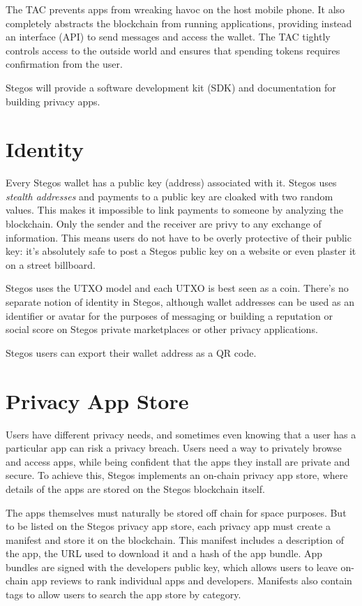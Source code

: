 \documentclass[8pt,fleqn,openany]{book}
\begin{document}
The TAC prevents apps from wreaking havoc on the host mobile phone. It also completely abstracts the blockchain from running applications, providing instead an interface (API) to send messages and access the wallet. The TAC tightly controls access to the outside world and ensures that spending tokens requires confirmation from the user. 

Stegos will provide a software development kit (SDK) and documentation for building privacy apps. 

\section{Identity}\label{sec:identity}
Every Stegos wallet has a public key (address) associated with it. Stegos uses \textit{stealth addresses} and payments to a public key are cloaked with two random values. This makes it impossible to link payments to someone by analyzing the blockchain. Only the sender and the receiver are privy to any exchange of information. This means users do not have to be overly protective of their public key: it’s absolutely safe to post a Stegos public key on a website or even plaster it on a street billboard. 

Stegos uses the UTXO model and each UTXO is best seen as a coin. There’s no separate notion of identity in Stegos, although wallet addresses can be used as an identifier or avatar for the purposes of messaging or building a reputation or social score on Stegos private marketplaces or other privacy applications. 

Stegos users can export their wallet address as a QR code.
	
\section{Privacy App Store}\label{sec:appstore}
Users have different privacy needs, and sometimes even knowing that a user has a particular app can risk a privacy breach. Users need a way to privately browse and access apps, while being confident that the apps they install are private and secure. To achieve this, Stegos implements an on-chain privacy app store, where details of the apps are stored on the Stegos blockchain itself.

The apps themselves must naturally be stored off chain for space purposes. But to be listed on the Stegos privacy app store, each privacy app must create a manifest and store it on the blockchain. This manifest includes a description of the app, the URL used to download it and a hash of the app bundle. App bundles are signed with the developers public key, which allows users to leave on-chain app reviews to rank individual apps and developers. Manifests also contain tags to allow users to search the app store by category.
\end{document}
